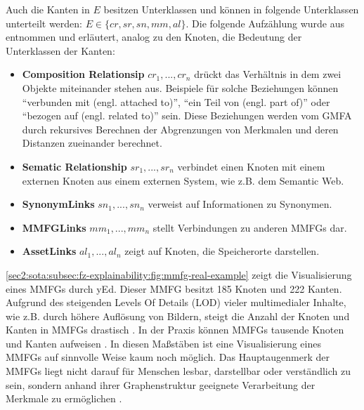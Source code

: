 Auch die Kanten in $E$ besitzen Unterklassen und können in folgende Unterklassen unterteilt werden: $E \in \{cr,sr,sn,mm,al\}$.
Die folgende Aufzählung wurde aus \cite{ai-based-sem-ind-retr-soc} entnommen und erläutert, analog zu den Knoten, die Bedeutung der Unterklassen der Kanten:
\begin{itemize}
    \item \textbf{Composition Relationsip} $cr_{1},...,cr_{n}$ drückt das Verhältnis in dem zwei Objekte miteinander stehen aus.
    Beispiele für solche Beziehungen können \enquote{verbunden mit (engl. attached to)}, \enquote{ein Teil von (engl. part of)} oder \enquote{bezogen auf (engl. related to)} sein.
    Diese Beziehungen werden vom GMFA durch rekursives Berechnen der Abgrenzungen von Merkmalen und deren Distanzen zueinander berechnet.
    \item \textbf{Sematic Relationship} $sr_{1},...,sr_{n}$ verbindet einen Knoten mit einem externen Knoten aus einem externen System, wie z.B. dem Semantic Web.
    \item \textbf{SynonymLinks} $sn_{1},...,sn_{n}$ verweist auf Informationen zu Synonymen.
    \item \textbf{MMFGLinks} $mm_{1},...,mm_{n}$ stellt Verbindungen zu anderen MMFGs dar.
    \item \textbf{AssetLinks} $al_{1},...,al_{n}$ zeigt auf Knoten, die Speicherorte darstellen.
\end{itemize}
\cref{sec2:sota:subsec:fz-explainability:fig:mmfg-real-example} zeigt die Visualisierung eines MMFGs durch yEd.
Dieser MMFG besitzt 185 Knoten und 222 Kanten.
Aufgrund des steigenden Levels Of Details (LOD) vieler multimedialer Inhalte, wie z.B. durch höhere Auflösung von Bildern, steigt die Anzahl der Knoten und Kanten in MMFGs drastisch \cite{ai-based-sem-ind-retr-soc}.
In der Praxis können MMFGs tausende Knoten und Kanten aufweisen \cite{jour-smmir}.
In diesen Maßstäben ist eine Visualisierung eines MMFGs auf sinnvolle Weise kaum noch möglich.
Das Hauptaugenmerk der MMFGs liegt nicht darauf für Menschen lesbar, darstellbar oder verständlich zu sein, sondern anhand ihrer Graphenstruktur geeignete Verarbeitung der Merkmale zu ermöglichen \cite{ai-based-sem-ind-retr-soc}.

